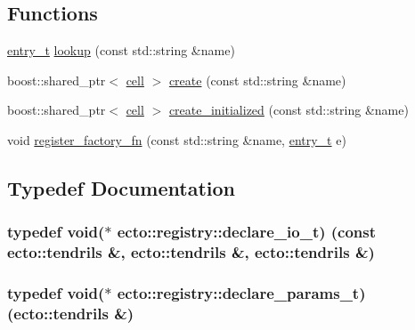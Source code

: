 \subsection*{Functions}
\begin{DoxyCompactItemize}
\item 
\hyperlink{structecto_1_1registry_1_1entry__t}{entry\+\_\+t} \hyperlink{namespaceecto_1_1registry_a6418eb4a71ad1556cf3555da28e16a8d}{lookup} (const std\+::string \&name)
\item 
boost\+::shared\+\_\+ptr$<$ \hyperlink{structecto_1_1cell}{cell} $>$ \hyperlink{namespaceecto_1_1registry_a784e20c3d722892c0ce9f129b6c2f757}{create} (const std\+::string \&name)
\item 
boost\+::shared\+\_\+ptr$<$ \hyperlink{structecto_1_1cell}{cell} $>$ \hyperlink{namespaceecto_1_1registry_af698665e1f634f8634ecd7348aa778ab}{create\+\_\+initialized} (const std\+::string \&name)
\item 
void \hyperlink{namespaceecto_1_1registry_aef6687acec4199b3863fac767049bf76}{register\+\_\+factory\+\_\+fn} (const std\+::string \&name, \hyperlink{structecto_1_1registry_1_1entry__t}{entry\+\_\+t} e)
\end{DoxyCompactItemize}


\subsection{Typedef Documentation}
\hypertarget{namespaceecto_1_1registry_aeb28ed8594052fabba16371c256380c4}{}
\subsubsection[{declare\+\_\+io\+\_\+t}]{\setlength{\rightskip}{0pt plus 5cm}typedef void($\ast$ ecto\+::registry\+::declare\+\_\+io\+\_\+t) (const {\bf ecto\+::tendrils} \&, {\bf ecto\+::tendrils} \&, {\bf ecto\+::tendrils} \&)}\label{namespaceecto_1_1registry_aeb28ed8594052fabba16371c256380c4}
\hypertarget{namespaceecto_1_1registry_ac7ab506518f9462777eb958eeff86d4f}{}
\subsubsection[{declare\+\_\+params\+\_\+t}]{\setlength{\rightskip}{0pt plus 5cm}typedef void($\ast$ ecto\+::registry\+::declare\+\_\+params\+\_\+t) ({\bf ecto\+::tendrils} \&)}\label{namespaceecto_1_1registry_ac7ab506518f9462777eb958eeff86d4f}
\hypertarget{namespaceecto_1_1registry_afc9d1f3d51e708d9304a2f1e77cf4e4c}{}

